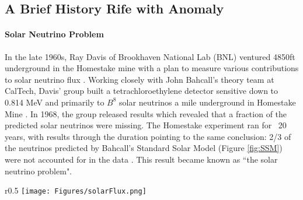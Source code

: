 \documentclass[12pt]{article}
\begin{document}
\subsection{A Brief History Rife with Anomaly}
\paragraph {Solar Neutrino Problem} In the late 1960s, Ray Davis of Brookhaven National Lab (BNL) ventured 4850ft underground in the Homestake mine with a plan to measure various contributions to solar neutrino flux \cite{ray0}. Working closely with John Bahcall's theory team at CalTech, Davis' group built a tetrachloroethylene detector sensitive down to 0.814 MeV and primarily to $B^8$ solar neutrinos a mile underground in Homestake Mine \cite{ray0}. In 1968, the group released results which revealed that a fraction of the predicted solar neutrinos were missing. The Homestake experiment ran for ~20 years, with results through the duration pointing to the same conclusion: 2/3 of the neutrinos predicted by Bahcall's Standard Solar Model (Figure \ref{fig:SSM}) were not accounted for in the data \cite{ray0}. This result became known as ``the solar neutrino problem".

\begin{wrapfigure}{r}{0.5\textwidth}
\texttt{[image: Figures/solarFlux.png]}
\caption{John Bahcall's Standard Solar Flux Model}
\label{fig:SSM}
\end{wrapfigure}
\end{document}
